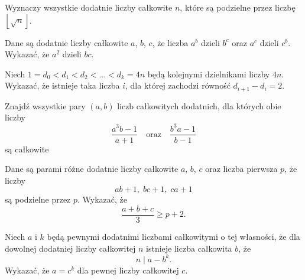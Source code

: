 \begin{problem}{1}
	Wyznaczy wszystkie dodatnie liczby całkowite $n$, które są podzielne przez liczbę~$\left\lfloor \sqrt{n} \right\rfloor$.
\end{problem}


\begin{problem}{2}
	Dane są dodatnie liczby całkowite $a$, $b$, $c$, że liczba $a^b$ dzieli $b^c$ oraz $a^c$ dzieli $c^b$. Wykazać, że $a^2$ dzieli $bc$.
\end{problem}

\begin{problem}{3}
	Niech $1 = d_0 < d_1 < d_2 < ... < d_k = 4n$ będą kolejnymi dzielnikami liczby $4n$. Wykazać, że istnieje taka liczba $i$, dla której zachodzi równość $d_{i + 1} - d_i = 2$.
\end{problem}

\begin{problem}{4}
	Znajdź wszystkie pary $(a, b)$ liczb całkowitych dodatnich, dla których obie liczby
	\[
		\frac{a^3b - 1}{a + 1} \quad \text{oraz} \quad \frac{b^3a - 1}{b - 1}
	\]
	są całkowite
\end{problem}

\begin{problem}{5}
	Dane są parami różne dodatnie liczby całkowite $a$, $b$, $c$ oraz liczba pierwsza $p$, że liczby
	\[
		ab + 1, \; bc + 1, \; ca + 1
	\] 
	są podzielne przez $p$. Wykazać, że
	\[
		\frac{a + b + c}{3} \geqslant p + 2.
	\]
\end{problem}

\begin{problem}{6}
	Niech $a$ i $k$ będą pewnymi dodatnimi liczbami całkowitymi o tej własności, że dla dowolnej dodatniej liczby całkowitej $n$ istnieje liczba całkowita $b$, że
	\[
		n \mid a - b^k.
	\]
	Wykazać, że $a = c^k$ dla pewnej liczby całkowitej $c$.
\end{problem}

